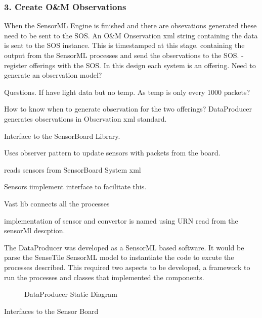 \documentclass[]{final_report}
\begin{document}
\subsubsection {3. Create O\&M Observations}

When the SensorML Engine is finished
and there are obsevations generated these
need to be sent to the SOS. An O\&M Onservation
xml string containing the data is sent to
the SOS instance. This is timestamped at
this stage.
 containing the output from
the SensorML processes and send the observations
to the SOS.
-register offerings with the SOS. In this design
each system is an offering.
Need to generate an observation model?


Questions.
If have light data but no temp. As temp is only
every 1000 packets?

How to know when to generate observation
for the two offerings?
DataProducer generates observations in Observation xml standard.

Interface to the SensorBoard Library.

Uses observer pattern to update sensors with packets from the board.

reads sensors from SensorBoard System xml

Sensors iimplement interface to facilitate this.

Vast lib connects all the processes

implementation of sensor and convertor is named using URN read from the sensorMl descption.


The DataProducer was developed as a SensorML based software. It would be parse the SenseTile SensorML model to instantiate the code to excute the processes described. This required two aspects to be developed, a framework to run the processes and classes that implemented the components.

\begin{figure}[h]
\caption{DataProducer Static Diagram}\label{fig:bon_static_diagam_producer.png}
\end{figure}

Interfaces to the Sensor Board


\newpage
\end{document}
